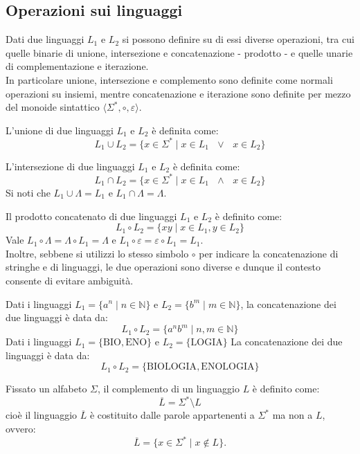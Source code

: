 \documentclass{article}
\begin{document}
\subsection{Operazioni sui linguaggi}
Dati due linguaggi $L_1$ e $L_2$ si possono definire  su di essi diverse operazioni, tra cui quelle binarie di unione, intersezione e concatenazione - prodotto - e quelle unarie di complementazione e iterazione.\\ In particolare unione, intersezione e complemento sono definite come normali operazioni su insiemi, mentre concatenazione e iterazione sono definite per mezzo del monoide sintattico $\langle \Sigma^*, \circ, \varepsilon \rangle$. 
\\\noindent
\begin{definition}  L'unione di due linguaggi $L_1$ e $L_2$ è definita come:
\[ L_1 \cup L_2 = \{ x \in \Sigma^* \mid x \in L_1 \text{ $\vee$ } x \in L_2 \} \]
\end{definition}
\begin{definition} 
L'intersezione di due linguaggi $L_1$ e $L_2$ è definita come:
\[ L_1 \cap L_2 = \{ x \in \Sigma^* \mid x \in L_1 \text{ $\wedge$ } x \in L_2 \} \]
Si noti che \( L_1 \cup \Lambda = L_1 \) e \( L_1 \cap \Lambda = \Lambda \).
\end{definition}
\begin{definition}
Il prodotto concatenato di due linguaggi $L_1$ e $L_2$ è definito come:
\[ L_1 \circ L_2 = \{ xy \mid x \in L_1, y \in L_2 \} \]
Vale \( L_1 \circ \Lambda = \Lambda \circ L_1 = \Lambda \) e \(L_1 \circ \varepsilon = \varepsilon \circ L_1 = L_1 \). \\Inoltre, sebbene si utilizzi lo stesso simbolo $\circ$ per indicare la concatenazione di stringhe e di linguaggi, le due operazioni sono diverse e dunque il contesto consente di evitare ambiguità.
\end{definition}
\begin{example}
Dati i linguaggi 
\( L_1 = \{ a^n \mid n \in \mathbb{N} \} \) e \( L_2 = \{ b^m \mid m \in \mathbb{N} \} \),
la concatenazione dei due linguaggi è data da:
\[
L_1 \circ L_2 = \{ a^n b^m \mid n,m \in \mathbb{N} \}
\]
 Dati i linguaggi 
\(L_1 = \{\text{BIO}, \text{ENO}\}\) e \( L_2 = \{\text{LOGIA}\}\)
La concatenazione dei due linguaggi è data da:
\[
L_1 \circ L_2 = \{\text{BIOLOGIA}, \text{ENOLOGIA}\}
\]

\end{example}
\begin{definition} %
Fissato un alfabeto $\Sigma$, il complemento di un linguaggio \( L \) è definito come:
\[
\overline{L} = \Sigma^* \setminus L
\]
cioè il linguaggio \( \overline{L} \) è costituito dalle parole appartenenti a \( \Sigma^* \) ma non a \( L \), ovvero:
\[
\overline{L} = \{ x \in \Sigma^* \mid x \notin L \}.
\]
\end{definition}
\end{document}
